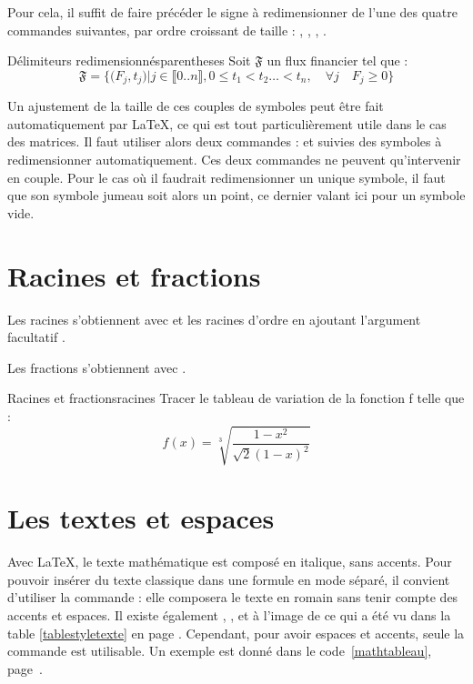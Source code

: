 Pour cela, il suffit de faire précéder le signe à redimensionner de l'une des quatre commandes suivantes, par ordre croissant de taille : , , , .

\begin{codedouble}{Délimiteurs redimensionnés}{parentheses}
Soit $\mathfrak{F}$ un flux financier tel que :
\[ \mathfrak{F} = \Big\{ \big(F_j,t_j\big) \Big| j \in \llbracket 0..n \rrbracket, 
0 \leqslant t_1 < t_2\dots < t_n, \quad \forall j \quad F_j \geqslant 0 \Big\} \]
\end{codedouble}

Un ajustement de la taille de ces couples de symboles peut être fait automatiquement par \LaTeX, ce qui est tout particulièrement utile dans le cas des matrices. Il faut utiliser alors deux  commandes :  et  suivies des symboles à redimensionner automatiquement. Ces deux  commandes ne peuvent qu'intervenir en couple. Pour le cas où il faudrait redimensionner un unique symbole, il faut que son symbole jumeau soit alors un point, ce dernier valant ici pour un symbole vide. %

\section{Racines et fractions}

Les racines s'obtiennent avec  et les racines d'ordre  en ajoutant l'argument facultatif \macron{[n]}.

Les fractions s'obtiennent avec . 

\begin{codedouble}{Racines et fractions}{racines}
Tracer le tableau de variation de la fonction f telle que :
\[ f(x) = \sqrt[3]{\frac{1-x^2}{\sqrt{2}(1-x)^2}} \]
\end{codedouble}

\section{Les textes et espaces}

Avec \LaTeX, le texte mathématique est composé en italique, sans accents. Pour pouvoir insérer du texte classique dans une formule en mode séparé, il convient d'utiliser la commande  : elle composera le texte en romain sans tenir compte des accents et espaces. Il existe également , ,  et  à l'image de ce qui a été vu dans la table \ref{tablestyletexte} en page \pageref{tablestyletexte}. Cependant, pour avoir espaces et accents, seule la commande  est utilisable. Un exemple est donné dans le code~\ref{mathtableau}, page~\pageref{mathtableau}.

